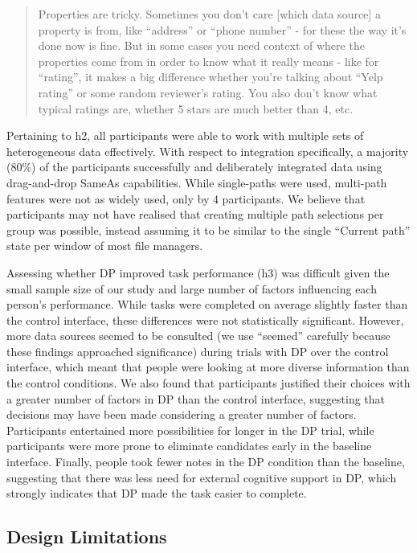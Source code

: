 \documentclass{sigchi}
\begin{document}
\begin{quote}
Properties are tricky. Sometimes you don't care [which data source] a property is from, like ``address'' or ``phone number'' - for these the way it's done now is fine. But in some cases you need context of where the properties come from in order to know what it really means - like for ``rating'', it makes a big difference whether you're talking about ``Yelp rating'' or some random reviewer's rating.  You also don't know what typical ratings are, whether 5 stars are much better than 4, etc.
\end{quote}

Pertaining to h2, all participants were able to work with multiple sets of heterogeneous data effectively.  With respect to integration specifically, a majority (80\%) of the participants successfully and deliberately integrated data using drag-and-drop SameAs capabilities.  While single-paths were used, multi-path features were not as widely used, only by 4 participants. We believe that participants may not have realised that creating multiple path selections per group was possible, instead assuming it to be similar to the single ``Current path'' state per window of most file managers. 

Assessing whether DP improved task performance (h3) was difficult given the small sample size of our study and large number of factors influencing each person's performance.  While tasks were completed on average slightly faster than the control interface, these differences were not statistically significant.  However, more data sources seemed to be consulted (we use ``seemed'' carefully because these findings approached significance) during trials with DP over the control interface, which meant that people were looking at more diverse information than the control conditions.  We also found that participants justified their choices with a greater number of factors in DP than the control interface, suggesting that decisions may have been made considering a greater number of factors.  Participants entertained more possibilities for longer in the DP trial, while participants were more prone to eliminate candidates early in the baseline interface.  Finally, people took fewer notes in the DP condition than the baseline, suggesting that there was less need for external cognitive support in DP, which strongly indicates that DP made the task easier to complete.

\subsection{Design Limitations}
\end{document}
